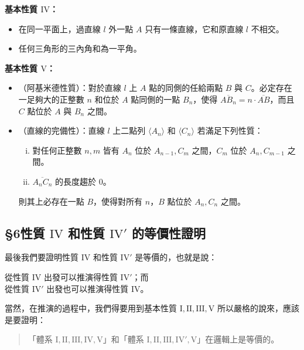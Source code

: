 \noindent\textbf{基本性質 $\mathrm{IV}$：}
\begin{itemize}[leftmargin=2.8em, itemsep=0.2em]
  \item[$\mathrm{IV}$：]在同一平面上，過直線 $l$ 外一點 $A$ 只有一條直線，它和原直線 $l$ 不相交。
  \item[$\mathrm{IV}'$：]任何三角形的三內角和為一平角。
\end{itemize}

\noindent\textbf{基本性質 $\mathrm{V}$：}
\begin{itemize}[leftmargin=2.8em, itemsep=0.2em]
  \item[$\mathrm{V}_a$：]（阿基米德性質）：對於直線 $l$ 上 $A$ 點的同側的任給兩點 $B$ 與 $C$。必定存在一足夠大的正整數 $n$ 和位於 $A$ 點同側的一點 $B_n$，使得 $\overline{AB_n} = n \cdot \overline{AB}$，而且 $C$ 點位於 $A$ 與 $B_n$ 之間。
  \item[$\mathrm{V}_b$：]（直線的完備性）：直線 $l$ 上二點列 $\langle A_n \rangle$ 和 $\langle C_n \rangle$ 若滿足下列性質：
  \begin{enumerate}[(i)]
    \item 對任何正整數 $n, m$ 皆有 $A_n$ 位於 $A_{n-1}, C_m$ 之間，$C_m$ 位於 $A_n, C_{m-1}$ 之間。
    \item $\overline{A_nC_n}$ 的長度趨於 0。
  \end{enumerate}
  則其上必存在一點 $B$，使得對所有 $n$，$B$ 點位於 $A_n, C_n$ 之間。
\end{itemize}

\subsection*{\S 6\quad 性質 $\mathrm{IV}$ 和性質 $\mathrm{IV}'$ 的等價性證明}
\label{sec:b3s_a1_6}

最後我們要證明性質 $\mathrm{IV}$ 和性質 $\mathrm{IV}'$ 是等價的，也就是說：
\begin{center}
  從性質 $\mathrm{IV}$ 出發可以推演得性質 $\mathrm{IV}'$；而\\
  從性質 $\mathrm{IV}'$ 出發也可以推演得性質 $\mathrm{IV}$。
\end{center}
當然，在推演的過程中，我們得要用到基本性質 $\mathrm{I}, \mathrm{II}, \mathrm{III}, \mathrm{V}$ 所以嚴格的說來，應該是要證明：
\begin{quote}
  「體系 $\mathrm{I}, \mathrm{II}, \mathrm{III}, \mathrm{IV}, \mathrm{V}$」和「體系 $\mathrm{I}, \mathrm{II}, \mathrm{III}, \mathrm{IV}', \mathrm{V}$」在邏輯上是等價的。
\end{quote}

